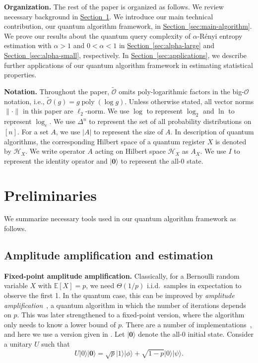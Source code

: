 \documentclass[journal]{IEEEtran}
\renewcommand{\sec}[1]{\hyperref[sec:#1]{Section~\ref*{sec:#1}}}
\newcommand{\E}{\mathbb{E}}
\DeclareMathOperator{\poly}{poly}
\newcommand{\syzn}[1]{{\color{violet}{#1}}}
\begin{document}
\vspace{3mm}
\noindent
\textbf{Organization.}
The rest of the paper is organized as follows. We review necessary background in \sec{prelim}. We introduce our main technical contribution, our quantum algorithm framework, in \sec{main-algorithm}. We prove our results about the quantum query complexity of $\alpha$-R{\'e}nyi entropy estimation with $\alpha>1$ and $0<\alpha<1$ in \sec{alpha-large} and \sec{alpha-small}, respectively. In \sec{applications}, we describe further applications of our quantum algorithm framework in estimating statistical properties.

\vspace{3mm}
\noindent
\textbf{Notation.}
Throughout the paper, $\widetilde{\mathcal{O}}$ omits poly-logarithmic factors in the big-$\mathcal{O}$ notation, i.e., $\widetilde{\mathcal{O}}(g)=g\poly(\log g)$. Unless otherwise stated, all vector norms $\|\cdot \|$ in this paper are $\ell_2$-norm. We use $\log$ to represent $\log_2$ and $\ln$ to represent $\log_e$. We use $\Delta^n$ to represent the set of all probability distributions on $[n]$. For a set $A$, we use $|A|$ to represent the size of $A$. In description of quantum algorithms, the corresponding Hilbert space of a quantum register $X$ is denoted by $\mathcal{H}_X$. We write operator $A$ acting on Hilbert space $\mathcal{H}_X$ as $A_X$. We use $I$ to represent the identity oprator and $|\mathbf{0}\rangle$ to represent the all-0 state. 


\section{Preliminaries}\label{sec:prelim}
We summarize necessary tools used in our quantum algorithm framework as follows.

\subsection{Amplitude amplification and estimation}
\noindent
\textbf{Fixed-point amplitude amplification.}
Classically, for a Bernoulli random variable $X$ with $\E[X] = p$, we need $\Theta(1/p)$ i.i.d.~samples in expectation to observe the first 1. In the quantum case, this can be improved by {\it amplitude amplification}~\cite{brassard2002quantum}, a quantum algorithm in which the number of iterations depends on $p$.  This was later strengthened to a fixed-point version, where the algorithm only needs to know a lower bound of $p$. There are a number of implementations~\cite{hoyer2000arbitrary,grover2005fixed,tulsi2006new,aaronson2012quantum,yoder2014fixed}, and here we use a version given in \cite{gilyen2019singular}.
Let $|\mathbf{0}\rangle$ denote the all-0 initial state. %
Consider a unitary $U$ such that
\begin{equation}
    \label{eq:quantum_bernoulli}
    U|0\rangle|\mathbf{0}\rangle = \sqrt{p}|1\rangle|\phi\rangle + \sqrt{1-p}|0\rangle|\psi\rangle.
\end{equation}
\end{document}
